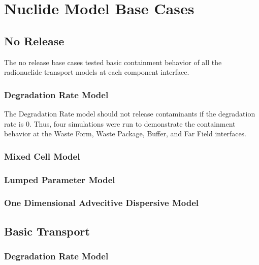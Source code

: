 \section{Nuclide Model Base Cases}\label{sec:nuclide_base_cases}
\subsection{No Release}
The no release base cases tested basic containment behavior of all the 
radionuclide transport models at each component interface. 

\subsubsection{Degradation Rate Model}
The Degradation Rate model should not release contaminants if the degradation 
rate is 0. Thus, four simulations were run to demonstrate the containment 
behavior at the Waste Form, Waste Package, Buffer, and Far Field interfaces. 




\subsubsection{Mixed Cell Model}



\subsubsection{Lumped Parameter Model}



\subsubsection{One Dimensional Advecitive Dispersive Model}



\subsection{Basic Transport}

\subsubsection{Degradation Rate Model}

